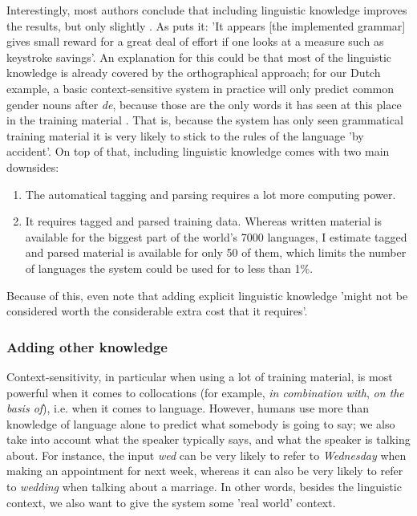 \documentclass[12pt]{article}
\begin{document}
Interestingly, most authors conclude that including linguistic knowledge improves the results, but only slightly . As  puts it: 'It appears [the implemented grammar] gives small reward for a great deal of effort if one looks at a measure such as keystroke savings'. An explanation for this could be that most of the linguistic knowledge is already covered by the orthographical approach; for our Dutch example, a basic context-sensitive system in practice will only predict common gender nouns after \emph{de}, because those are the only words it has seen at this place in the training material . That is, because the system has only seen grammatical training material it is very likely to stick to the rules of the language 'by accident'. On top of that, including linguistic knowledge comes with two main downsides: 

\begin{enumerate}
\item The automatical tagging and parsing requires a lot more computing power.
\item It requires tagged and parsed training data. Whereas written material is available for the biggest part of the world's 7000 languages, I estimate tagged and parsed material is available for only 50 of them, which limits the number of languages the system could be used for to less than 1\%.
\end{enumerate}

Because of this,  even note that adding explicit linguistic knowledge 'might not be considered worth the considerable extra cost that it requires'.

\subsubsection{Adding other knowledge} \label{more_knowledge}

Context-sensitivity, in particular when using a lot of training material, is most powerful when it comes to collocations (for example, \emph{in combination with}, \emph{on the basis of}), i.e. when it comes to language. However, humans use more than knowledge of language alone to predict what somebody is going to say; we also take into account what the speaker typically says, and what the speaker is talking about. For instance, the input \emph{wed} can be very likely to refer to \emph{Wednesday} when making an appointment for next week, whereas it can also be very likely to refer to \emph{wedding} when talking about a marriage. In other words, besides the linguistic context, we also want to give the system some 'real world' context.
\end{document}
